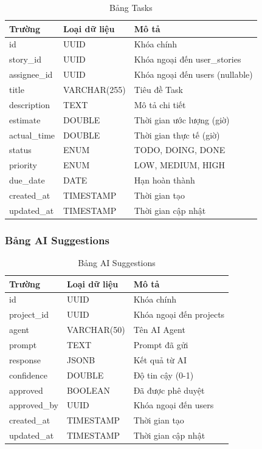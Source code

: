\documentclass[12pt,a4paper]{report}
\begin{document}
\begin{table}[H]
\centering
\caption{Bảng Tasks}
\begin{tabular}{|p{4cm}|p{3.5cm}|p{6cm}|}
\hline
\textbf{Trường} & \textbf{Loại dữ liệu} & \textbf{Mô tả} \\
\hline
id & UUID & Khóa chính \\
\hline
story\_id & UUID & Khóa ngoại đến user\_stories \\
\hline
assignee\_id & UUID & Khóa ngoại đến users (nullable) \\
\hline
title & VARCHAR(255) & Tiêu đề Task \\
\hline
description & TEXT & Mô tả chi tiết \\
\hline
estimate & DOUBLE & Thời gian ước lượng (giờ) \\
\hline
actual\_time & DOUBLE & Thời gian thực tế (giờ) \\
\hline
status & ENUM & TODO, DOING, DONE \\
\hline
priority & ENUM & LOW, MEDIUM, HIGH \\
\hline
due\_date & DATE & Hạn hoàn thành \\
\hline
created\_at & TIMESTAMP & Thời gian tạo \\
\hline
updated\_at & TIMESTAMP & Thời gian cập nhật \\
\hline
\end{tabular}
\label{tab:tasks_table}
\end{table}

\subsubsection{Bảng AI Suggestions}

\begin{table}[H]
\centering
\caption{Bảng AI Suggestions}
\begin{tabular}{|p{4cm}|p{3.5cm}|p{6cm}|}
\hline
\textbf{Trường} & \textbf{Loại dữ liệu} & \textbf{Mô tả} \\
\hline
id & UUID & Khóa chính \\
\hline
project\_id & UUID & Khóa ngoại đến projects \\
\hline
agent & VARCHAR(50) & Tên AI Agent \\
\hline
prompt & TEXT & Prompt đã gửi \\
\hline
response & JSONB & Kết quả từ AI \\
\hline
confidence & DOUBLE & Độ tin cậy (0-1) \\
\hline
approved & BOOLEAN & Đã được phê duyệt \\
\hline
approved\_by & UUID & Khóa ngoại đến users \\
\hline
created\_at & TIMESTAMP & Thời gian tạo \\
\hline
updated\_at & TIMESTAMP & Thời gian cập nhật \\
\hline
\end{tabular}
\label{tab:ai_suggestions_table}
\end{table}
\end{document}
